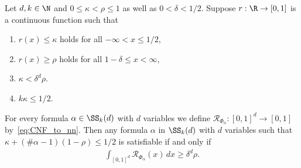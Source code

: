 \documentclass{amsart}[11pt]
\numberwithin{equation}{section}
\newcommand{\realization}{\mathcal{R}}
\numberwithin{theorem}{section}
\begin{document}
\begin{proposition}\label{prop:tanh_sufficient_properties_of_rd}
    Let $d, k \in \N$ and $0 \leq \kappa < \rho \leq 1$ as well as $0 < \delta < 1/2$. Suppose $r: \R \to [0, 1]$ is a continuous function such that 
    \begin{enumerate}
        \item[(i)] $r(x) \leq \kappa$ holds for all $-\infty < x \leq 1/2$,
        \item[(ii)] $r(x) \geq \rho$ holds for all $1 - \delta \leq x < \infty$,
        \item[(iii)] $\kappa < \delta^d \rho$. \label{item:decision_condition}
        \item[(iv)] $k\kappa \leq 1/2$.
    \end{enumerate}
    For every formula $\alpha \in \SS_k(d)$ with $d$ variables we define $\realization_{\Phi_\alpha}: [0, 1]^d \to [0, 1]$ by~\eqref{eq:CNF_to_nn}. Then any formula $\alpha$ in $\SS_k(d)$ with $d$ variables such that $\kappa + (\# \alpha - 1)(1 - \rho) \leq 1/2$ is satisfiable if and only if
    \begin{align*}
        \int_{[0, 1]^d} \realization_{\Phi_\alpha}(x) \, dx \geq \delta^d \rho.
    \end{align*}
\end{proposition}
\end{document}
